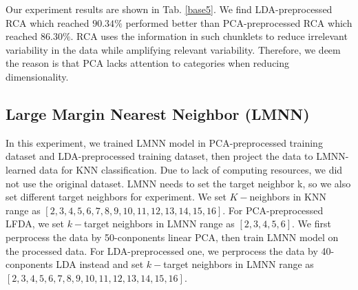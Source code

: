\documentclass[conference]{IEEEtran}
\begin{document}
Our experiment results are shown in Tab. \ref{base5}. We find LDA-preprocessed RCA which reached $90.34\%$ performed better than PCA-preprocessed RCA which reached $86.30\%$. RCA uses the information in such chunklets to reduce irrelevant variability in the data while amplifying relevant variability. Therefore, we deem the reason is that PCA lacks attention to categories when reducing dimensionality.
\subsection{Large Margin Nearest Neighbor (LMNN)}

In this experiment, we trained LMNN model in PCA-preprocessed training dataset and LDA-preprocessed training dataset, then project the data to LMNN-learned data for KNN classification. Due to lack of computing resources, we did not use the original dataset. LMNN needs to set the target neighbor k, so we also set different target neighbors for experiment. We set $K-$neighbors in KNN range as $[2, 3, 4, 5, 6, 7, 8, 9, 10, 11, 12, 13, 14, 15, 16]$. For PCA-preprocessed LFDA, we set $k-$target neighbors in LMNN range as $[2,3,4,5,6]$. We first perprocess the data by 50-conponents linear PCA, then train LMNN model on the processed data. For LDA-preprocessed one, we perprocess the data by 40-conponents LDA instead and set $k-$target neighbors in LMNN range as $[2, 3, 4, 5, 6, 7, 8, 9, 10, 11, 12, 13, 14, 15, 16]$. 
\end{document}
